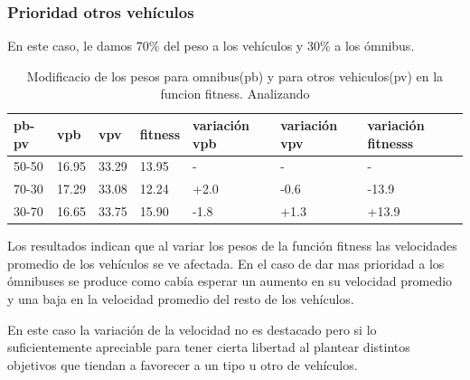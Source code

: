 \subsubsection{Prioridad otros vehículos}

En este caso, le damos 70\% del peso a los vehículos y 30\% a los ómnibus.



\begin{table}[h]
	\renewcommand{\arraystretch}{1.2}
	\caption{Modificacio de los pesos para omnibus(pb) y para otros vehiculos(pv) en la funcion fitness. Analizando}
	\label{table:analisis_fitness}
	\centering
	\begin{tabular}{p{2cm}p{2cm}p{2cm}p{2cm}p{2cm}p{2cm}p{2cm} }
		\hline
		
		pb-pv& 
		vpb & 
		vpv &
		fitness &
		variación \newline vpb &
		variación \newline vpv &
		variación \newline fitnesss
		\\ 
		\hline
		50-50  & 16.95 & 33.29 & 13.95  &- & - & -\\		
		70-30  & 17.29 & 33.08 & 12.24  & +2.0 & -0.6 & -13.9\\		
		30-70  & 16.65 & 33.75 & 15.90 & -1.8 & +1.3 & +13.9\\
		\hline
	\end{tabular}
\end{table}


Los resultados indican que al variar los pesos de la función fitness las velocidades promedio de los vehículos se ve afectada. En el caso de dar mas prioridad a los ómnibuses se produce como cabía esperar un aumento en su velocidad promedio y una baja en la velocidad promedio del resto de los vehículos.

En este caso la variación de la velocidad no es destacado pero si lo suficientemente apreciable para tener cierta libertad al plantear distintos objetivos que tiendan a favorecer a un tipo u otro de vehículos.








